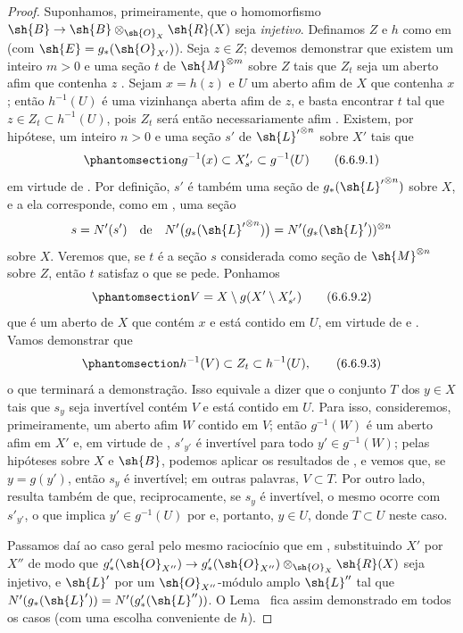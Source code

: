 \documentclass[oneside,10pt]{amsart}
\makeatletter
\newcommand{\ega@arrow}[2]{\mathchoice{#1}{#2}{#2}{#2}}
\renewcommand{\to}{\ega@arrow{\longrightarrow}{\rightarrow}}
\newcommand{\oldpage}[2][]{\marginnote{\normalfont\footnotesize\textbf{#1}~|~#2}\ignorespaces}
\let\EGAOriginalLabel\label
\renewcommand{\label}[1]{\phantomsection\EGAOriginalLabel{#1}}
\makeatother
\begin{document}
\begin{proof}
Suponhamos, primeiramente, que o homomorfismo $\sh{B}\to\sh{B}\otimes_{\sh{O}_X}\sh{R}(X)$ seja \emph{injetivo}.
Definamos $Z$ e $h$ como em  (com $\sh{E}=g_*(\sh{O}_{X'})$).
Seja $z\in Z$;
devemos demonstrar que existem um inteiro $m>0$ e uma seção $t$ de $\sh{M}^{\otimes m}$ sobre $Z$ tais que $Z_t$ seja um aberto afim que contenha $z$ .
Sejam $x=h(z)$ e $U$ um aberto afim de $X$ que contenha $x$;
então $h^{-1}(U)$ é uma vizinhança aberta afim de $z$, e basta encontrar $t$ tal que $z\in Z_t\subset h^{-1}(U)$, pois $Z_t$ será então necessariamente afim .
Existem, por hipótese, um inteiro $n>0$ e uma seção $s'$ de ${\sh{L}'}^{\otimes n}$ sobre $X'$ tais que
\[
\label{II.6.6.9.1}
  g^{-1}(x) \subset X'_{s'} \subset g^{-1}(U)
\tag{6.6.9.1}
\]
em virtude de .
Por definição, $s'$ é também uma seção de $g_*({\sh{L}'}^{\otimes n})$ sobre $X$, e a ela corresponde, como em , uma seção
\[
  s=N'(s')
  \quad\text{de}\quad
  N'\bigl(g_*({\sh{L}'}^{\otimes n})\bigr)
  =N'(g_*(\sh{L}'))^{\otimes n}
\]
sobre
\oldpage[II]{134}
$X$.
Veremos que, se $t$ é a seção $s$ considerada como seção de $\sh{M}^{\otimes n}$ sobre $Z$, então $t$ satisfaz o que se pede.
Ponhamos
\[
\label{II.6.6.9.2}
  V = X\setminus g(X'\setminus X'_{s'})
\tag{6.6.9.2}
\]
que é um aberto de $X$ que contém $x$ e está contido em $U$, em virtude de  e .
Vamos demonstrar que
\[
\label{II.6.6.9.3}
  h^{-1}(V) \subset Z_t \subset h^{-1}(U),
\tag{6.6.9.3}
\]
o que terminará a demonstração.
Isso equivale a dizer que o conjunto $T$ dos $y\in X$ tais que $s_y$ seja invertível contém $V$ e está contido em $U$.
Para isso, consideremos, primeiramente, um aberto afim $W$ contido em $V$;
então $g^{-1}(W)$ é um aberto afim em $X'$ e, em virtude de , $s'_{y'}$ é invertível para todo $y'\in g^{-1}(W)$;
pelas hipóteses sobre $X$ e $\sh{B}$, podemos aplicar os resultados de , e vemos que, se $y=g(y')$, então $s_y$ é invertível;
em outras palavras, $V\subset T$.
Por outro lado, resulta também de  que, reciprocamente, se $s_y$ é invertível, o mesmo ocorre com $s'_{y'}$, o que implica $y'\in g^{-1}(U)$ por  e, portanto, $y\in U$, donde $T\subset U$ neste caso.

Passamos daí ao caso geral pelo mesmo raciocínio que em , substituindo $X'$ por $X''$ de modo que $g'_*(\sh{O}_{X''})\to g'_*(\sh{O}_{X''})\otimes_{\sh{O}_X}\sh{R}(X)$ seja injetivo, e $\sh{L}'$ por um $\sh{O}_{X''}$-módulo amplo $\sh{L}''$ tal que $N'(g_*(\sh{L}'))=N'(g'_*(\sh{L}''))$.
O Lema~ fica assim demonstrado em todos os casos (com uma escolha conveniente de $h$).
\end{proof}
\end{document}
